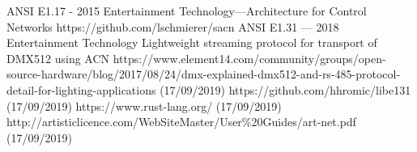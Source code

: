 \documentclass[12pt,a4paper,notitlepage]{report}
\begin{document}
\begin{thebibliography}{9}
	ANSI E1.17 - 2015 Entertainment Technology—Architecture for Control Networks
	https://github.com/lschmierer/sacn
	ANSI E1.31 — 2018 Entertainment Technology Lightweight streaming protocol for transport of DMX512 using ACN
	https://www.element14.com/community/groups/open-source-hardware/blog/2017/08/24/dmx-explained-dmx512-and-rs-485-protocol-detail-for-lighting-applications (17/09/2019)
	https://github.com/hhromic/libe131 (17/09/2019)
	https://www.rust-lang.org/ (17/09/2019)
	http://artisticlicence.com/WebSiteMaster/User\%20Guides/art-net.pdf (17/09/2019)
	
	
\end{thebibliography}
\end{document}
